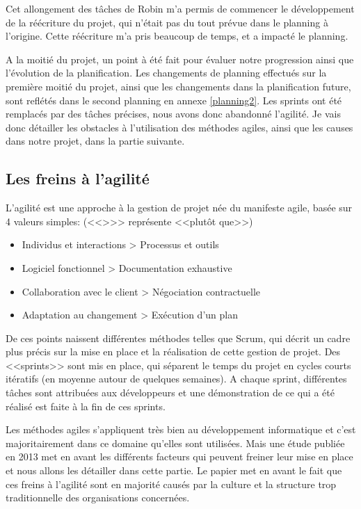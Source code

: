\documentclass[openany, 11pt]{memoir}
\begin{document}
Cet allongement des tâches de Robin m'a permis de commencer le développement de la réécriture du projet, qui n'était pas du tout prévue dans le planning à l'origine. Cette réécriture m'a pris beaucoup de temps, et a impacté le planning.

\bigskip
A la moitié du projet, un point à été fait pour évaluer notre progression ainsi que l'évolution de la planification. Les changements de planning effectués sur la première moitié du projet, ainsi que les changements dans la planification future, sont reflétés dans le second planning en annexe \ref{planning2}. Les sprints ont été remplacés par des tâches précises, nous avons donc abandonné l'agilité. Je vais donc détailler les obstacles à l'utilisation des méthodes agiles, ainsi que les causes dans notre projet, dans la partie suivante.

\subsection{Les freins à l'agilité}

L'agilité est une approche à la gestion de projet née du manifeste agile, basée sur 4 valeurs simples: (<<{>}>> représente <<plutôt que>>)

\begin{itemize}
	\item Individus et interactions > Processus et outils
	\item Logiciel fonctionnel > Documentation exhaustive
	\item Collaboration avec le client > Négociation contractuelle
	\item Adaptation au changement > Exécution d'un plan
\end{itemize}

De ces points naissent différentes méthodes telles que Scrum, qui décrit un cadre plus précis sur la mise en place et la réalisation de cette gestion de projet. Des <<sprints>> sont mis en place, qui séparent le temps du projet en cycles courts itératifs (en moyenne autour de quelques semaines). A chaque sprint, différentes tâches sont attribuées aux développeurs et une démonstration de ce qui a été réalisé est faite à la fin de ces sprints.

\bigskip
Les méthodes agiles s'appliquent très bien au développement informatique et c'est majoritairement dans ce domaine qu'elles sont utilisées. Mais une étude publiée en 2013 \cite{obstacles} met en avant les différents facteurs qui peuvent freiner leur mise en place et nous allons les détailler dans cette partie. Le papier met en avant le fait que ces freins à l'agilité sont en majorité causés par la culture et la structure trop traditionnelle des organisations concernées.
\end{document}

